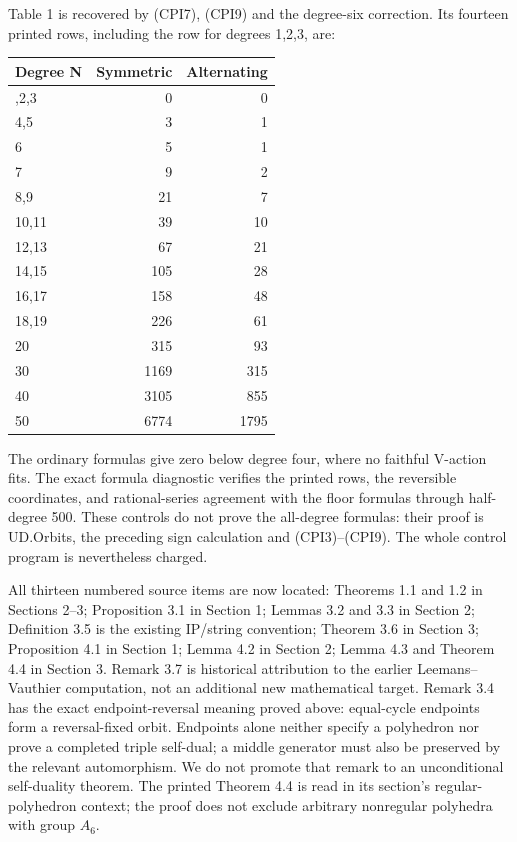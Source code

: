 Table 1 is recovered by (CPI7), (CPI9) and the degree-six correction.
Its fourteen printed rows, including the row for degrees 1,2,3, are:

{
\begin{longtable}[]{@{}lrr@{}}
\toprule\noalign{}
Degree N & Symmetric & Alternating \\
\midrule\noalign{}
\endhead
\bottomrule\noalign{}
\endlastfoot
1,2,3 & 0 & 0 \\
4,5 & 3 & 1 \\
6 & 5 & 1 \\
7 & 9 & 2 \\
8,9 & 21 & 7 \\
10,11 & 39 & 10 \\
12,13 & 67 & 21 \\
14,15 & 105 & 28 \\
16,17 & 158 & 48 \\
18,19 & 226 & 61 \\
20 & 315 & 93 \\
30 & 1169 & 315 \\
40 & 3105 & 855 \\
50 & 6774 & 1795 \\
\end{longtable}
}

The ordinary formulas give zero below degree four, where no faithful
V-action fits. The exact formula diagnostic verifies the printed rows,
the reversible coordinates, and rational-series agreement with the floor
formulas through half-degree 500. These controls do not prove the
all-degree formulas: their proof is UD.Orbits, the preceding sign
calculation and (CPI3)--(CPI9). The whole control program is
nevertheless charged.

All thirteen numbered source items are now located: Theorems 1.1 and 1.2
in Sections 2--3; Proposition 3.1 in Section 1; Lemmas 3.2 and 3.3 in
Section 2; Definition 3.5 is the existing IP/string convention; Theorem
3.6 in Section 3; Proposition 4.1 in Section 1; Lemma 4.2 in Section 2;
Lemma 4.3 and Theorem 4.4 in Section 3. Remark 3.7 is historical
attribution to the earlier Leemans--Vauthier computation, not an
additional new mathematical target. Remark 3.4 has the exact
endpoint-reversal meaning proved above: equal-cycle endpoints form a
reversal-fixed orbit. Endpoints alone neither specify a polyhedron nor
prove a completed triple self-dual; a middle generator must also be
preserved by the relevant automorphism. We do not promote that remark to
an unconditional self-duality theorem. The printed Theorem 4.4 is read
in its section's regular-polyhedron context; the proof does not exclude
arbitrary nonregular polyhedra with group \(A_6\).

